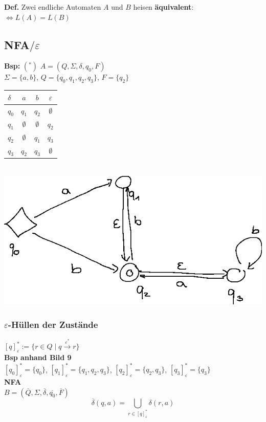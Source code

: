 \documentclass[10pt]{article}
\newcommand{\Bold}[1]{\textbf{#1}} %
\newcommand{\Oben}[2]{\overset{#1}{#2}} %
\begin{document}
\Bold{Def.} Zwei endliche Automaten $A$ und $B$ heisen \Bold{\"aquivalent}: $\Leftrightarrow L(A)=L(B)$
\subsection{NFA$/\varepsilon$}
\Bold{Bsp:} $(^*)$ $A=(Q,\Sigma,\delta,q_0,F)$\\
$\Sigma=\{a,b\}$, $Q=\{q_0,q_1,q_2,q_3\}$, $F=\{q_2\}$\\
\begin{tabular}{l|c|c|c}
 ${\delta}$&$a$&$b$&$\varepsilon$\\\hline
 $q_0$&$q_1$&$q_2$&$\emptyset$\\
 $q_1$&$\emptyset$&$\emptyset$&$q_2$\\
 $q_2$&$\emptyset$&$q_1$&$q_3$\\
 $q_3$&$q_2$&$q_3$&$\emptyset$
\end{tabular}\\
\includegraphics{Bild9.eps}\\
\subsubsection{$\varepsilon$-H\"ullen der Zust\"ande}
$[q]_\varepsilon^*:=\{r\in Q\mid q\Oben{\varepsilon^*}{\to}r\}$\\
\Bold{Bsp anhand Bild 9}\\
$[q_0]_\varepsilon^*=\{q_0\}$, $[q_1]_\varepsilon^*=\{q_1,q_2,q_3\}$, $[q_2]_\varepsilon^*=\{q_2,q_3\}$, $[q_3]_\varepsilon^*=\{q_3\}$\\
\Bold{NFA}\\
$B=(\overline{Q},\Sigma,\overline{\delta},\overline{q_0},\overline{F})$\\
\begin{equation} 
 \overline{\delta}(q,a)=\bigcup_{r\in[q]_\varepsilon^*}\delta(r,a)
\end{equation}
\end{document}
